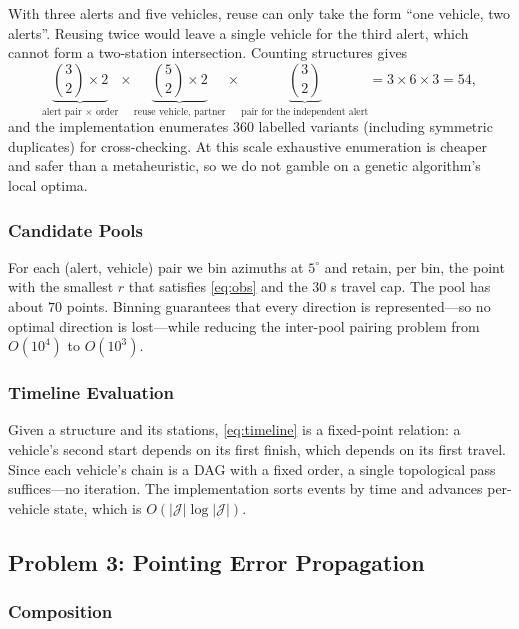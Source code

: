 \documentclass[12pt]{article}
\begin{document}
With three alerts and five vehicles, reuse can only take the form ``one vehicle, two alerts''. Reusing twice would leave a single vehicle for the third alert, which cannot form a two-station intersection. Counting structures gives
\begin{equation}
\label{eq:enum}
\underbrace{\binom{3}{2}\times2}_{\text{alert pair }\times\text{ order}}\times
\underbrace{\binom{5}{2}\times2}_{\text{reuse vehicle, partner}}\times
\underbrace{\binom{3}{2}}_{\text{pair for the independent alert}}
=3\times6\times3=54,
\end{equation}
and the implementation enumerates $360$ labelled variants (including symmetric duplicates) for cross-checking. At this scale exhaustive enumeration is cheaper and safer than a metaheuristic, so we do not gamble on a genetic algorithm's local optima.

\subsubsection{Candidate Pools}

For each (alert, vehicle) pair we bin azimuths at $5^\circ$ and retain, per bin, the point with the smallest $r$ that satisfies \eqref{eq:obs} and the $30$ s travel cap. The pool has about $70$ points. Binning guarantees that every direction is represented---so no optimal direction is lost---while reducing the inter-pool pairing problem from $O(10^4)$ to $O(10^3)$.

\subsubsection{Timeline Evaluation}

Given a structure and its stations, \eqref{eq:timeline} is a fixed-point relation: a vehicle's second start depends on its first finish, which depends on its first travel. Since each vehicle's chain is a DAG with a fixed order, a single topological pass suffices---no iteration. The implementation sorts events by time and advances per-vehicle state, which is $O(|\mathcal J|\log|\mathcal J|)$.

\subsection{Problem 3: Pointing Error Propagation}

\subsubsection{Composition}
\end{document}
